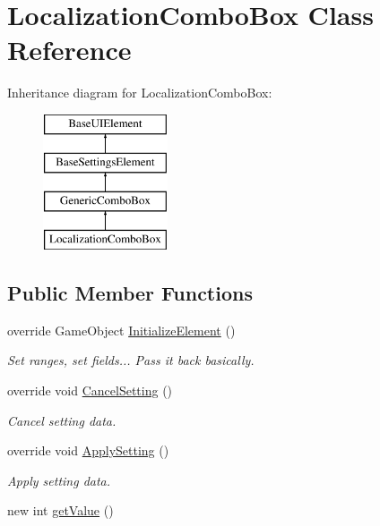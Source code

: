 \hypertarget{class_localization_combo_box}{}\section{Localization\+Combo\+Box Class Reference}
\label{class_localization_combo_box}
Inheritance diagram for Localization\+Combo\+Box\+:\begin{figure}[H]
\begin{center}
\leavevmode
\includegraphics[height=4.000000cm]{class_localization_combo_box}
\end{center}
\end{figure}
\subsection*{Public Member Functions}
\begin{DoxyCompactItemize}
\item 
override Game\+Object \hyperlink{class_localization_combo_box_ab676d6d7fe3c9c9d55259a8aec060622}{Initialize\+Element} ()
\begin{DoxyCompactList}\small\item\em Set ranges, set fields... Pass it back basically. \end{DoxyCompactList}\item 
override void \hyperlink{class_localization_combo_box_a67bf48bcaf083f7cdfb59fe2e82d0f12}{Cancel\+Setting} ()
\begin{DoxyCompactList}\small\item\em Cancel setting data. \end{DoxyCompactList}\item 
override void \hyperlink{class_localization_combo_box_ad531f8563cc8085e0129d4d719f8f82b}{Apply\+Setting} ()
\begin{DoxyCompactList}\small\item\em Apply setting data. \end{DoxyCompactList}\item 
new int \hyperlink{class_localization_combo_box_a710e8525fe4e686e2464030bd380bd85}{get\+Value} ()
\end{DoxyCompactItemize}
